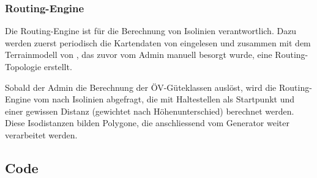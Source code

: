 \subsubsection{Routing-Engine}
\label{container:Routing-Engine}

Die Routing-Engine ist für die Berechnung von Isolinien verantwortlich.
Dazu werden zuerst periodisch die Kartendaten von  eingelesen und zusammen mit dem \gls{Terrainmodell} von , das zuvor vom Admin manuell besorgt wurde, eine Routing-Topologie erstellt.

Sobald der Admin die Berechnung der ÖV-Güteklassen auslöst, wird die Routing-Engine vom  nach Isolinien abgefragt, die mit Haltestellen als Startpunkt und einer gewissen Distanz (gewichtet nach Höhenunterschied) berechnet werden.
Diese Isodistanzen bilden Polygone, die anschliessend vom Generator weiter verarbeitet werden.


\subsection{Code}
\label{Architektur:Code}


